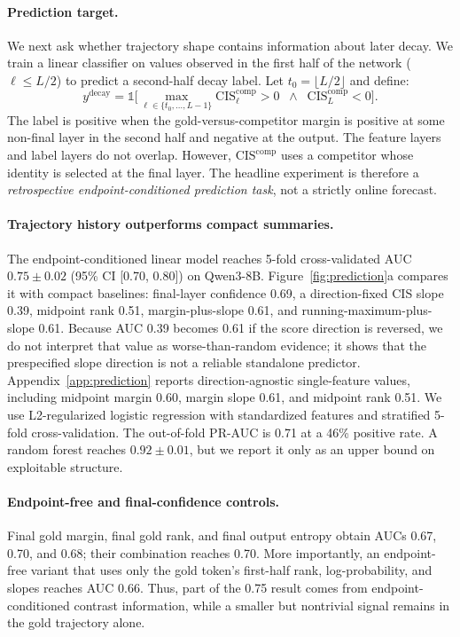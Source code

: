 \documentclass{article} %
\begin{document}
\paragraph{Prediction target.}
We next ask whether trajectory shape contains information about later decay. We train a linear classifier on values observed in the first half of the network ($\ell\leq L/2$) to predict a second-half decay label. Let $t_0=\lfloor L/2\rfloor$ and define:
\begin{equation}
y^{\mathrm{decay}} = \mathbb{1}\Big[\max_{\ell \in \{t_0,\ldots,L-1\}} \mathrm{CIS}^{\mathrm{comp}}_\ell > 0 \;\;\land\;\; \mathrm{CIS}^{\mathrm{comp}}_L < 0 \Big] .
\end{equation}
The label is positive when the gold-versus-competitor margin is positive at some non-final layer in the second half and negative at the output. The feature layers and label layers do not overlap. However, $\mathrm{CIS}^{\mathrm{comp}}$ uses a competitor whose identity is selected at the final layer. The headline experiment is therefore a \emph{retrospective endpoint-conditioned prediction task}, not a strictly online forecast.

\paragraph{Trajectory history outperforms compact summaries.}
The endpoint-conditioned linear model reaches 5-fold cross-validated AUC $0.75\pm0.02$ (95\% CI [0.70, 0.80]) on Qwen3-8B. Figure~\ref{fig:prediction}a compares it with compact baselines: final-layer confidence 0.69, a direction-fixed CIS slope 0.39, midpoint rank 0.51, margin-plus-slope 0.61, and running-maximum-plus-slope 0.61. Because AUC 0.39 becomes 0.61 if the score direction is reversed, we do not interpret that value as worse-than-random evidence; it shows that the prespecified slope direction is not a reliable standalone predictor. Appendix~\ref{app:prediction} reports direction-agnostic single-feature values, including midpoint margin 0.60, margin slope 0.61, and midpoint rank 0.51. We use L2-regularized logistic regression with standardized features and stratified 5-fold cross-validation. The out-of-fold PR-AUC is 0.71 at a 46\% positive rate. A random forest reaches $0.92\pm0.01$, but we report it only as an upper bound on exploitable structure.

\paragraph{Endpoint-free and final-confidence controls.}
Final gold margin, final gold rank, and final output entropy obtain AUCs 0.67, 0.70, and 0.68; their combination reaches 0.70. More importantly, an endpoint-free variant that uses only the gold token's first-half rank, log-probability, and slopes reaches AUC 0.66. Thus, part of the 0.75 result comes from endpoint-conditioned contrast information, while a smaller but nontrivial signal remains in the gold trajectory alone.
\end{document}
